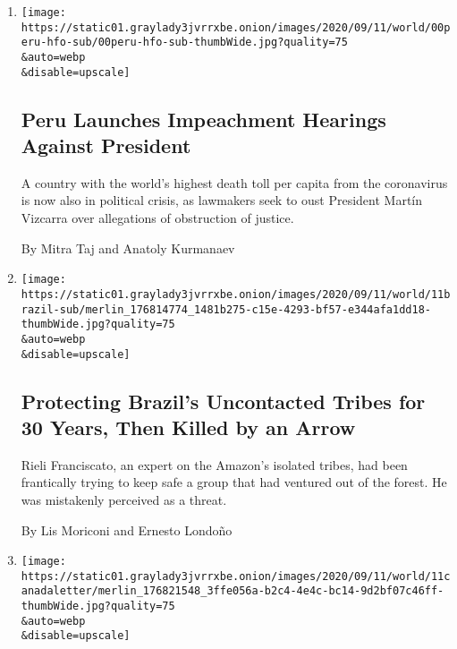 \begin{enumerate}
\def\labelenumi{\arabic{enumi}.}
\item
  \href{/2020/09/11/world/americas/peru-impeachment-president-martin-vizcarra.html}{}

  \texttt{[image: https://static01.graylady3jvrrxbe.onion/images/2020/09/11/world/00peru-hfo-sub/00peru-hfo-sub-thumbWide.jpg?quality=75\\\&auto=webp\\\&disable=upscale]}

  \hypertarget{peru-launches-impeachment-hearings-against-president}{%
  \subsection{Peru Launches Impeachment Hearings Against
  President}\label{peru-launches-impeachment-hearings-against-president}}

  A country with the world's highest death toll per capita from the
  coronavirus is now also in political crisis, as lawmakers seek to oust
  President Martín Vizcarra over allegations of obstruction of justice.

  By Mitra Taj and Anatoly Kurmanaev
\item
  \href{/2020/09/11/world/americas/brazil-uncontacted-tribes.html}{}

  \texttt{[image: https://static01.graylady3jvrrxbe.onion/images/2020/09/11/world/11brazil-sub/merlin\_176814774\_1481b275-c15e-4293-bf57-e344afa1dd18-thumbWide.jpg?quality=75\\\&auto=webp\\\&disable=upscale]}

  \hypertarget{protecting-brazils-uncontacted-tribes-for-30-years-then-killed-by-an-arrow}{%
  \subsection{Protecting Brazil's Uncontacted Tribes for 30 Years, Then
  Killed by an
  Arrow}\label{protecting-brazils-uncontacted-tribes-for-30-years-then-killed-by-an-arrow}}

  Rieli Franciscato, an expert on the Amazon's isolated tribes, had been
  frantically trying to keep safe a group that had ventured out of the
  forest. He was mistakenly perceived as a threat.

  By Lis Moriconi and Ernesto Londoño
\item
  \href{/2020/09/11/world/canada/the-vaccine-challenge-not-putting-all-our-eggs-in-one-basket.html}{}

  \texttt{[image: https://static01.graylady3jvrrxbe.onion/images/2020/09/11/world/11canadaletter/merlin\_176821548\_3ffe056a-b2c4-4e4c-bc14-9d2bf07c46ff-thumbWide.jpg?quality=75\\\&auto=webp\\\&disable=upscale]}


\end{enumerate}
